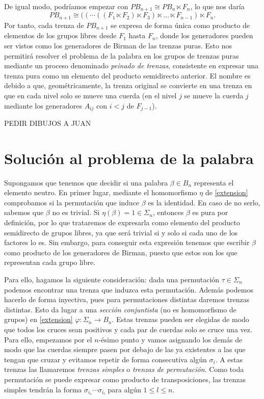 \documentclass[TFG.tex]{subfiles}
\begin{document}
De igual modo, podríamos empezar con $PB_{n+1}\cong PB_n\ltimes F_n$, lo que nos daría
$$PB_{n+1}\cong ((\cdots ((F_1\ltimes F_2)\ltimes F_3)\ltimes\dots\ltimes F_{n-1})\ltimes F_n.$$
Por tanto, cada trenza de $PB_{n+1}$ se expresa de forma única como producto de elementos de los grupos libres desde $F_1$ hasta $F_n$, donde los generadores pueden ser vistos como los generadores de Birman de las trenzas puras. Esto nos permitirá resolver el problema de la palabra en los grupos de trenzas puras mediante un proceso denominado \emph{peinado de trenzas}, consistente en expresar una trenza pura como un elemento del producto semidirecto anterior. El nombre es debido a que, geométricamente, la trenza original se convierte en una trenza en que en cada nivel solo se mueve una cuerda (en el nivel $j$ se mueve la cuerda $j$ mediante los generadores $A_{ij}$ con $i<j$ de $F_{j-1}$).

PEDIR DIBUJOS A JUAN


\section{Solución al problema de la palabra}\label{simples}

Supongamos que tenemos que decidir si una palabra $\beta\in B_n$ representa el elemento neutro. En primer lugar, mediante el homomorfismo $\eta$ de \ref{extension} comprobamos si la permutación que induce $\beta$ es la identidad. En caso de no serlo, sabemos que $\beta$ no es trivial. Si $\eta(\beta)=1\in\Sigma_n$, entonces $\beta$ es pura por definición, por lo que trataremos de expresarla como elemento del producto semidirecto de grupos libres, ya que será trivial si y solo si cada uno de los factores lo es. Sin embargo, para conseguir esta expresión tenemos que escribir $\beta$ como producto de los generadores de Birman, puesto que estos son los que representan cada grupo libre.

Para ello, hagamos la siguiente consideración: dada una permutación $\tau\in\Sigma_n$ podemos encontrar una trenza que induzca esta permutación. Además podemos hacerlo de forma inyectiva, pues para permutaciones distintas daremos trenzas distintas. Esto da lugar a una \emph{sección conjuntista} (no es homomorfismo de grupos) en \ref{extension} $\varphi:\Sigma_n\to B_n$. Estas trenzas pueden ser elegidas de modo que todos los cruces sean positivos y cada par de cuerdas solo se cruce una vez. Para ello, empezamos por el $n$-ésimo punto y vamos asignando los demás de modo que las cuerdas siempre pasen por debajo de las ya existentes a las que tengan que cruzar y evitamos repetir de forma consecutiva algún $\sigma_i$. A estas trenzas las llamaremos \emph{trenzas simples} o \emph{trenzas de permutación}. Como toda permutación se puede expresar como producto de transposiciones, las trenzas simples tendrán la forma $\sigma_{i_1}\cdots\sigma_{i_l}$ para algún $1\leq l\leq n$. 
\end{document}
